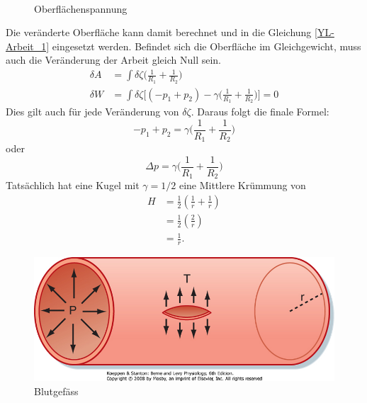 \begin{refsection}
\begin{equation}
\begin{split}
\end{split}
\end{equation} 
\begin{figure}
  \centering
  \caption{Oberflächenspannung} 
\end{figure}
Die veränderte Oberfläche kann damit berechnet und in die Gleichung \ref{YL-Arbeit_1} eingesetzt werden. Befindet sich die Oberfläche im Gleichgewicht, muss auch die Veränderung der Arbeit gleich Null sein.
\begin{equation}
\begin{split}
\delta A &= \int \delta\zeta \bigg( \frac{1}{R_1}+\frac{1}{R_2} \bigg) \\
\delta W &= \int \delta\zeta \bigg[ (-p_1+p_2)-\gamma \bigg( \frac{1}{R_1}+\frac{1}{R_2} \bigg) \bigg] =0
\end{split}
\end{equation}
Dies gilt auch für jede Veränderung von $\delta\zeta$. Daraus folgt die finale Formel:
\begin{equation}
-p_1+p_2 = \gamma\bigg( \frac{1}{R_1}+\frac{1}{R_2} \bigg)
\end{equation}
oder
\begin{equation}\label{Young-Laplace}
\Delta p = \gamma\bigg( \frac{1}{R_1}+\frac{1}{R_2} \bigg)
\end{equation}
Tatsächlich hat eine Kugel mit $\gamma=1/2$ eine Mittlere Krümmung von
\begin{equation}
\begin{split}
H &= \frac{1}{2}(\frac{1}{r}+\frac{1}{r}) \\
&= \frac{1}{2}(\frac{2}{r})\\
&=\frac{1}{r}.
\end{split}
\end{equation}
\begin{figure}
  \centering
  \includegraphics[scale=0.3]{minimal/BlutAder.jpg}
  \caption{Blutgefäss} 
  \label{fig:BlutAder}
\end{figure}


\end{refsection}
